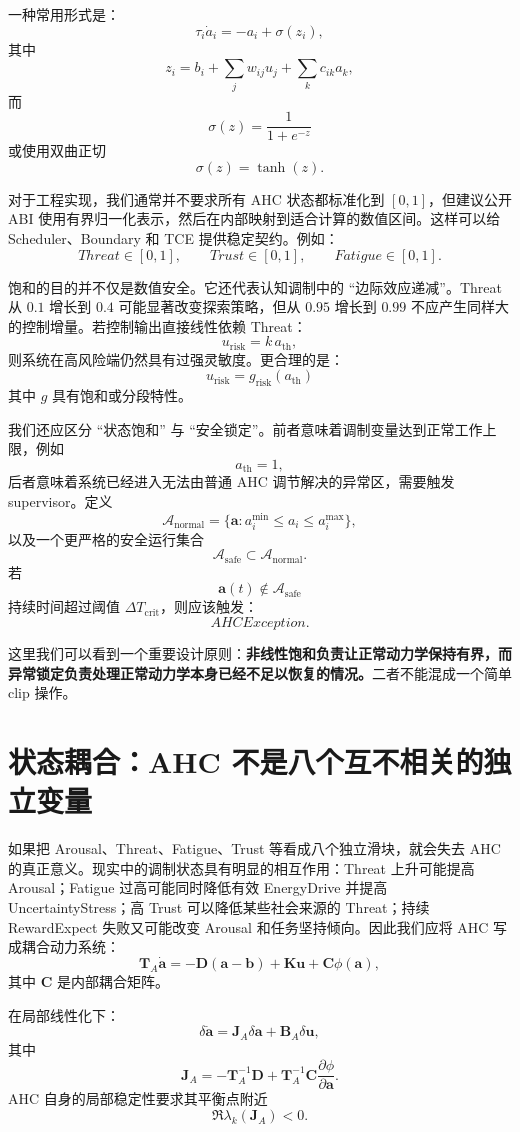 一种常用形式是：
\[
\tau_i\dot a_i
=
-a_i
+
\sigma(z_i),
\]
其中
\[
z_i
=
b_i
+
\sum_j w_{ij}u_j
+
\sum_k c_{ik}a_k,
\]
而
\[
\sigma(z)
=
\frac{1}{1+e^{-z}}
\]
或使用双曲正切
\[
\sigma(z)=\tanh(z).
\]

对于工程实现，我们通常并不要求所有 AHC 状态都标准化到 $[0,1]$，但建议公开 ABI 使用有界归一化表示，然后在内部映射到适合计算的数值区间。这样可以给 Scheduler、Boundary 和 TCE 提供稳定契约。例如：
\[
Threat\in[0,1],
\qquad
Trust\in[0,1],
\qquad
Fatigue\in[0,1].
\]

饱和的目的并不仅是数值安全。它还代表认知调制中的 ``边际效应递减''。Threat 从 $0.1$ 增长到 $0.4$ 可能显著改变探索策略，但从 $0.95$ 增长到 $0.99$ 不应产生同样大的控制增量。若控制输出直接线性依赖 Threat：
\[
u_{\mathrm{risk}}
=
k\,a_{\mathrm{th}},
\]
则系统在高风险端仍然具有过强灵敏度。更合理的是：
\[
u_{\mathrm{risk}}
=
g_{\mathrm{risk}}
(a_{\mathrm{th}})
\]
其中 $g$ 具有饱和或分段特性。

我们还应区分 ``状态饱和'' 与 ``安全锁定''。前者意味着调制变量达到正常工作上限，例如
\[
a_{\mathrm{th}}=1,
\]
后者意味着系统已经进入无法由普通 AHC 调节解决的异常区，需要触发 supervisor。定义
\[
\mathcal A_{\mathrm{normal}}
=
\{\mathbf a:
a_i^{\min}\le a_i\le a_i^{\max}\},
\]
以及一个更严格的安全运行集合
\[
\mathcal A_{\mathrm{safe}}
\subset
\mathcal A_{\mathrm{normal}}.
\]
若
\[
\mathbf a(t)\notin
\mathcal A_{\mathrm{safe}}
\]
持续时间超过阈值 $\Delta T_{\mathrm{crit}}$，则应该触发：
\[
AHCException.
\]

这里我们可以看到一个重要设计原则：\textbf{非线性饱和负责让正常动力学保持有界，而异常锁定负责处理正常动力学本身已经不足以恢复的情况。}二者不能混成一个简单 clip 操作。


\section{状态耦合：AHC 不是八个互不相关的独立变量}

如果把 Arousal、Threat、Fatigue、Trust 等看成八个独立滑块，就会失去 AHC 的真正意义。现实中的调制状态具有明显的相互作用：Threat 上升可能提高 Arousal；Fatigue 过高可能同时降低有效 EnergyDrive 并提高 UncertaintyStress；高 Trust 可以降低某些社会来源的 Threat；持续 RewardExpect 失败又可能改变 Arousal 和任务坚持倾向。因此我们应将 AHC 写成耦合动力系统：
\[
\mathbf T_A\dot{\mathbf a}
=
-\mathbf D(\mathbf a-\mathbf b)
+
\mathbf K\mathbf u
+
\mathbf C\phi(\mathbf a),
\]
其中 $\mathbf C$ 是内部耦合矩阵。

在局部线性化下：
\[
\delta\dot{\mathbf a}
=
\mathbf J_A
\delta\mathbf a
+
\mathbf B_A
\delta\mathbf u,
\]
其中
\[
\mathbf J_A
=
-\mathbf T_A^{-1}\mathbf D
+
\mathbf T_A^{-1}
\mathbf C
\frac{\partial\phi}{\partial\mathbf a}.
\]
AHC 自身的局部稳定性要求其平衡点附近
\[
\Re\lambda_k(\mathbf J_A)<0.
\]


